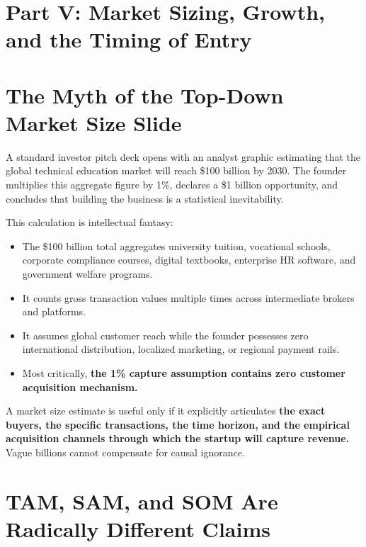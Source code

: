 \section*{Part V: Market Sizing, Growth, and the Timing of Entry}

\section{The Myth of the Top-Down Market Size Slide}

A standard investor pitch deck opens with an analyst graphic estimating that the global technical education market will reach \$100 billion by 2030. The founder multiplies this aggregate figure by 1\%, declares a \$1 billion opportunity, and concludes that building the business is a statistical inevitability.

This calculation is intellectual fantasy:
\begin{itemize}[leftmargin=12pt,itemsep=1pt,topsep=1pt]
  \item The \$100 billion total aggregates university tuition, vocational schools, corporate compliance courses, digital textbooks, enterprise HR software, and government welfare programs.
  \item It counts gross transaction values multiple times across intermediate brokers and platforms.
  \item It assumes global customer reach while the founder possesses zero international distribution, localized marketing, or regional payment rails.
  \item Most critically, \textbf{the 1\% capture assumption contains zero customer acquisition mechanism.}
\end{itemize}

A market size estimate is useful only if it explicitly articulates \textbf{the exact buyers, the specific transactions, the time horizon, and the empirical acquisition channels through which the startup will capture revenue.} Vague billions cannot compensate for causal ignorance.

\section{TAM, SAM, and SOM Are Radically Different Claims}

